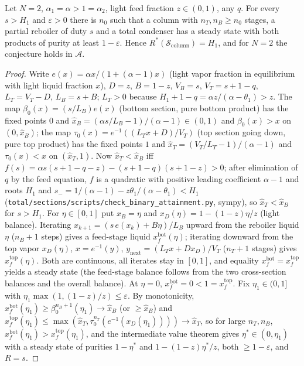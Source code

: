 \begin{proposition}\label{prop:binary}
Let $N=2$, $\alpha_1=\alpha>1=\alpha_2$, light feed fraction $z\in(0,1)$, any $q$. For every $s>H_1$ and $\varepsilon>0$ there is $n_0$
such that a column with $n_T,n_B\ge n_0$ stages, a partial reboiler of duty $s$ and a total condenser has a steady
state with both products of purity at least $1-\varepsilon$. Hence $R^*(\mathcal S_{\mathrm{column}})=H_1$, and for $N=2$ the
conjecture holds in $\mathcal A$.
\end{proposition}
\begin{proof}
Write $e(x)=\alpha x/(1+(\alpha-1)x)$ (light vapor fraction in equilibrium with light liquid fraction $x$), $D=z$,
$B=1-z$, $V_B=s$, $V_T=s+1-q$, $L_T=V_T-D$, $L_B=s+B$; $L_T>0$ because $H_1+1-q=\alpha z/(\alpha-\theta_1)>z$. The map
$\beta_0(x)=(s/L_B)e(x)$ (bottom section, pure bottom product) has the fixed points $0$ and
$\hat x_B=(\alpha s/L_B-1)/(\alpha-1)\in(0,1)$ and $\beta_0(x)>x$ on $(0,\hat x_B)$; the map $\tau_0(x)=e^{-1}((L_Tx+D)/V_T)$ (top
section going down, pure top product) has the fixed points $1$ and $\hat x_T=(V_T/L_T-1)/(\alpha-1)$ and $\tau_0(x)<x$ on
$(\hat x_T,1)$. Now $\hat x_T<\hat x_B$ iff $f(s)=\alpha s(s+1-q-z)-(s+1-q)(s+1-z)>0$; after elimination of $q$ by the feed
equation, $f$ is a quadratic with positive leading coefficient $\alpha-1$ and roots $H_1$ and
$s_-=1/(\alpha-1)-z\theta_1/(\alpha-\theta_1)<H_1$ (\texttt{total/sections/scripts/check\_binary\_attainment.py}, sympy), so
$\hat x_T<\hat x_B$ for $s>H_1$. For $\eta\in[0,1]$ put $x_B=\eta$ and $x_D(\eta)=1-(1-z)\eta/z$ (light balance). Iterating
$x_{k+1}=(s\,e(x_k)+B\eta)/L_B$ upward from the reboiler liquid $\eta$ ($n_B+1$ steps) gives a feed-stage liquid
$x^{\mathrm{bot}}_f(\eta)$; iterating downward from the top vapor $x_D(\eta)$, $x=e^{-1}(y)$, $y_{\mathrm{next}}=(L_Tx+Dx_D)/V_T$
($n_T+1$ stages) gives $x^{\mathrm{top}}_f(\eta)$. Both are continuous, all iterates stay in $[0,1]$, and equality
$x^{\mathrm{bot}}_f=x^{\mathrm{top}}_f$ yields a steady state (the feed-stage balance follows from the two cross-section balances
and the overall balance). At $\eta=0$, $x^{\mathrm{bot}}_f=0<1=x^{\mathrm{top}}_f$. Fix $\eta_1\in(0,1]$ with
$\eta_1\max(1,(1-z)/z)\le\varepsilon$. By monotonicity, $x^{\mathrm{bot}}_f(\eta_1)\ge\beta_0^{n_B+1}(\eta_1)\to\hat x_B$ (or $\ge\hat x_B$) and
$x^{\mathrm{top}}_f(\eta_1)\le\max(\hat x_T,\tau_0^{n_T}(e^{-1}(x_D(\eta_1))))\to\hat x_T$, so for large $n_T,n_B$,
$x^{\mathrm{bot}}_f(\eta_1)>x^{\mathrm{top}}_f(\eta_1)$, and the intermediate value theorem gives $\eta^*\in(0,\eta_1)$ with a steady
state of purities $1-\eta^*$ and $1-(1-z)\eta^*/z$, both $\ge1-\varepsilon$, and $R=s$.
\end{proof}

